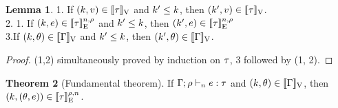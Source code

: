 \documentclass[a4paper,11pt]{article}
\theoremstyle{definition}
\newtheorem{thm}{Theorem}
\newtheorem{lem}[thm]{Lemma}
\begin{document}
\clearpage
\begin{lem}\label{lem:downward}
1. If $(k, v) \in [\![ \tau ]\!]_{\text{V}}$ and $k' \leq k$,
then $(k', v) \in [\![ \tau ]\!]_{\text{V}}$.\\
2. 1. If $(k, e) \in [\![ \tau ]\!]_{\text{E}}^{n, \rho}$ and $k' \leq k$,
then $(k', e) \in [\![ \tau ]\!]_{\text{E}}^{n, \rho}$\\
3.If $(k, \theta) \in [\![ \Gamma ]\!]_{\text{V}}$ and $k' \leq k$, then $(k', \theta) \in [\![ \Gamma ]\!]_{\text{V}}$.
\end{lem}
%
\begin{proof}
(1,2) simultaneously proved by induction on $\tau$, 3 followed by (1, 2).
\end{proof}
\begin{thm}[Fundamental theorem]
  If $\Gamma; \rho \vdash_{n} e: \tau$ and $(k, \theta)
  \in [\![ \Gamma ]\!]_{\text{V}}$, then $(k, (\theta, e)) \in
  [\![ \tau ]\!]_{\text{E}}^{\rho, n}$.
\end{thm}
%
\end{document}
